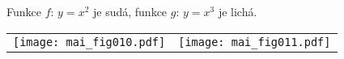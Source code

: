 \begin{mdframed}[style=mdexam]
\begin{example}\label{MAI:exam024} 
  Funkce $f:\,y=x^2$ je sudá, funkce $g:\,y=x^3$ je lichá.
  
  {\centering
   \begin{tabular}{cc}
     \texttt{[image: mai\_fig010.pdf]}              &
     \texttt{[image: mai\_fig011.pdf]}             \\
  \end{tabular}
  \captionsetup{type=figure}
  \label{MAI:fig_002}
  \par}
\end{example}
\end{mdframed}